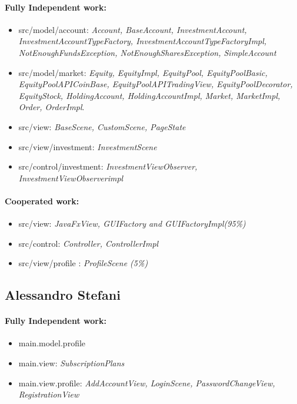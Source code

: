 \documentclass[a4paper,12pt]{report}
\begin{document}
\paragraph*{Fully Independent work:}
\begin{itemize}
    \item src/model/account: \textit{Account, BaseAccount, InvestmentAccount, 
    InvestmentAccountTypeFactory, InvestmentAccountTypeFactoryImpl, NotEnoughFundsException, NotEnoughSharesException, SimpleAccount}
    \item src/model/market: \textit{Equity, EquityImpl, EquityPool, EquityPoolBasic, 
    EquityPoolAPICoinBase, EquityPoolAPITradingView, EquityPoolDecorator, 
    EquityStock, HoldingAccount, HoldingAccountImpl, Market, MarketImpl, Order, OrderImpl}.
    \item src/view: \textit{BaseScene, CustomScene, PageState}
    \item src/view/investment: \textit{InvestmentScene}
    \item src/control/investment: \textit{InvestmentViewObserver, InvestmentViewObserverimpl}
\end{itemize}

\paragraph*{Cooperated work:}
\begin{itemize}
     \item src/view: \textit{JavaFxView, GUIFactory and GUIFactoryImpl(95\%)}
     \item src/control: \textit{Controller, ControllerImpl}
     \item src/view/profile : \textit{ProfileScene (5\%)}
\end{itemize}

\subsection{Alessandro Stefani}
\paragraph*{Fully Independent work:}
\begin{itemize}
    \item main.model.profile
    \item main.view: \textit{SubscriptionPlans}
    \item main.view.profile: \textit{AddAccountView, LoginScene, PasswordChangeView, RegistrationView}
\end{itemize}
\end{document}

